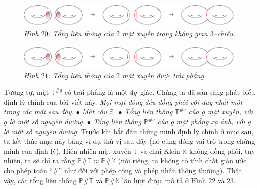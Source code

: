 \begin{multicols}{2}
	\begin{figure}[H]
		\vspace*{-5pt}
		\centering\captionsetup{labelformat=empty, justification=centering}
		\includegraphics[width=1\linewidth]{H20.pdf}
		\caption{\small\textit{\color{duongvaotoanhoc}Hình $20$: Tổng liên thông của $2$ mặt xuyến trong không gian $3$--chiều.}}
		\vspace*{-10pt}
	\end{figure}
	\begin{figure}[H]
		\vspace*{-5pt}
		\centering\captionsetup{labelformat=empty, justification=centering}
		\includegraphics[width=1\linewidth]{H20.pdf}
		\caption{\small\textit{\color{duongvaotoanhoc}Hình $21$: Tổng liên thông của $2$ mặt xuyến được trải phẳng.}}
		\vspace*{-10pt}
	\end{figure}
	Tương tự, mặt  $\mathbb{T}^{\# g}$ có trải phẳng là một $4g$--giác.
	\vskip 0.1cm
	Chúng ta đã sẵn sàng phát biểu định lý chính của bài viết này.
	\vskip 0.1cm
	{\it Mọi mặt đóng đều đồng phôi với duy nhất một trong các mặt sau đây.
	\vskip 0.1cm
	$\bullet$ Mặt cầu $\mathbb{S}$.
	\vskip 0.1cm
	$\bullet$ Tổng liên thông $\mathbb{T}^{\# g}$ của $g$ mặt xuyến, với $g$ là một số nguyên dương.
	\vskip 0.1cm
	$\bullet$ Tổng liên thông $\mathbb{P}^{\# g}$ của $g$ mặt phẳng xạ ảnh, với $g$ là một số nguyên dương.}
	\vskip 0.1cm
	Trước khi bắt đầu chứng minh định lý chính ở mục sau, ta kết thúc mục này bằng ví dụ thú vị sau đây (nó cũng đóng vai trò trong chứng minh của định lý). Hiển nhiên mặt xuyến $\mathbb{T}$ và chai Klein $\mathbb{K}$ không đồng phôi, tuy nhiên, ta sẽ chỉ ra rằng $\mathbb{P} \# \mathbb{T} \approx \mathbb{P} \# \mathbb{K}$ (nói riêng, ta không có tính chất giản ước cho phép toán ``$\#$'' như đối với phép cộng và phép nhân thông thường). Thật vậy, các tổng liên thông $\mathbb{P} \# \mathbb{T}$ và $\mathbb{P} \# \mathbb{K}$ lần lượt được mô tả ở Hình $22$ và $23$.
	\begin{figure}[H]
		\vspace*{-5pt}
		\centering\captionsetup{labelformat=empty, justification=centering}

\end{figure}
\end{multicols}
